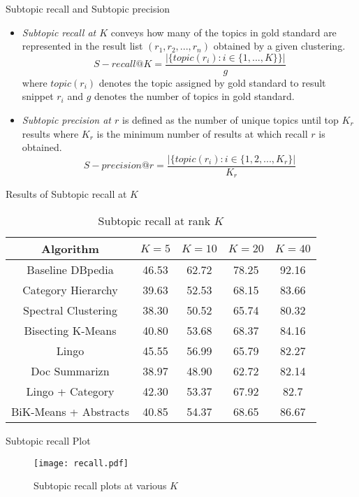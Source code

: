 \documentclass{beamer}
\begin{document}
\begin{frame}{Subtopic recall and Subtopic precision}
\begin{itemize}
\item {\it Subtopic recall at $K$} conveys how many of the topics in gold standard are
represented in the result list $(r_1,r_2,...,r_n)$ obtained by a given
clustering.
$$
S-recall@K = \frac{|\{topic(r_i): i \in \{1,...,K\}\}|}{g}
$$
where $topic(r_i)$ denotes the topic assigned by gold standard to
result snippet $r_i$ and $g$ denotes the number of topics in gold
standard.

\item {\it Subtopic precision at $r$} is defined as the number of
  unique topics until top $K_r$ results where $K_r$ is the minimum
  number of results at which recall $r$ is obtained.
$$
S-precision@r = \frac{|\{topic(r_i): i \in \{1,2,...,K_r\}|}{K_r}
$$
\end{itemize}
\end{frame}
\begin{frame}{Results of Subtopic recall at $K$}
\begin{table}[h]
\centering
\begin{tabular} {|c | c | c | c|c|}
  \hline
  Algorithm & $K = 5$ & $K = 10$  & $K = 20$ & $K = 40$ \\
  \hline
  Baseline DBpedia & 46.53 & 62.72 & 78.25 & 92.16 \\
  Category Hierarchy & 39.63 & 52.53 & 68.15 & 83.66 \\
  Spectral Clustering & 38.30 & 50.52 & 65.74 & 80.32 \\
  \hline
  Bisecting K-Means & 40.80 & 53.68 & 68.37 & 84.16 \\
  Lingo & 45.55 & 56.99 & 65.79 & 82.27 \\
  Doc Summarizn & 38.97 & 48.90 & 62.72 & 82.14 \\
  \hline
  Lingo + Category & 42.30 & 53.37 & 67.92 & 82.7 \\
  BiK-Means + Abstracts & 40.85 & 54.37 & 68.65 & 86.67 \\
  \hline
\end{tabular}
\caption{Subtopic recall at rank $K$}
\end{table}
\end{frame}

\begin{frame}{Subtopic recall Plot}
\begin{figure}[h]
  \centering
  \texttt{[image: recall.pdf]}
  \caption{Subtopic recall plots at various $K$}
  \label{fig:recall}
\end{figure}
\end{frame}
\end{document}
